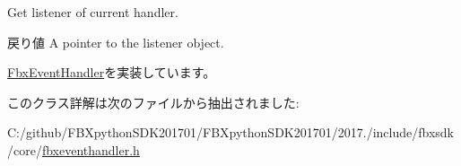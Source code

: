 Get listener of current handler. \begin{DoxyReturn}{戻り値}
A pointer to the listener object. 
\end{DoxyReturn}


\hyperlink{class_fbx_event_handler_a6d496102fe1253372bb042840c2d45a7}{Fbx\+Event\+Handler}を実装しています。



このクラス詳解は次のファイルから抽出されました\+:\begin{DoxyCompactItemize}
\item 
C\+:/github/\+F\+B\+Xpython\+S\+D\+K201701/\+F\+B\+Xpython\+S\+D\+K201701/2017./include/fbxsdk/core/\hyperlink{fbxeventhandler_8h}{fbxeventhandler.\+h}\end{DoxyCompactItemize}
